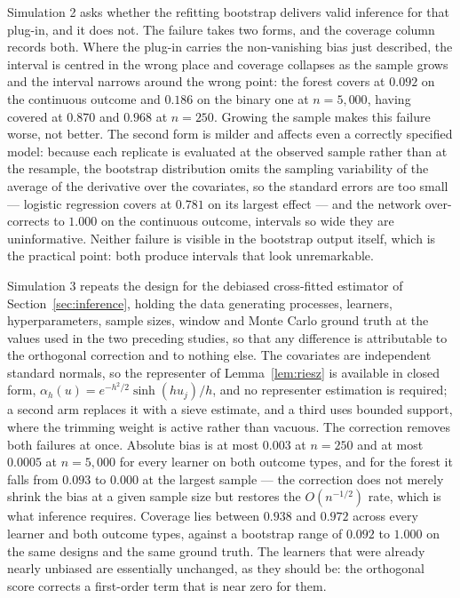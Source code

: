 \documentclass[12pt,a4paper]{article}
\numberwithin{equation}{section}
\theoremstyle{plain}
\theoremstyle{definition}
\begin{document}
	Simulation 2 asks whether the refitting bootstrap delivers valid inference
	for that plug-in, and it does not. The failure takes two forms, and the
	coverage column records both. Where the plug-in carries the non-vanishing
	bias just described, the interval is centred in the wrong place and
	coverage collapses as the sample grows and the interval narrows around the
	wrong point: the forest covers at $0.092$ on the continuous outcome and
	$0.186$ on the binary one at $n=5{,}000$, having covered at $0.870$ and
	$0.968$ at $n=250$. Growing the sample makes this failure worse, not better.
	The second form is milder and affects even a correctly specified model:
	because each replicate is evaluated at the observed sample rather than at the
	resample, the bootstrap distribution omits the sampling variability of the
	average of the derivative over the covariates, so the standard errors are too
	small --- logistic regression covers at $0.781$ on its largest effect --- and
	the network over-corrects to $1.000$ on the continuous outcome, intervals so
	wide they are uninformative. Neither failure is visible in the bootstrap
	output itself, which is the practical point: both produce intervals that look
	unremarkable.

	Simulation 3 repeats the design for the debiased cross-fitted estimator of
	Section~\ref{sec:inference}, holding the data generating processes, learners,
	hyperparameters, sample sizes, window and Monte Carlo ground truth at the
	values used in the two preceding studies, so that any difference is
	attributable to the orthogonal correction and to nothing else. The covariates
	are independent standard normals, so the representer of
	Lemma~\ref{lem:riesz} is available in closed form,
	$\alpha_h(u) = e^{-h^2/2}\sinh(h u_j)/h$, and no representer estimation is
	required; a second arm replaces it with a sieve estimate, and a third uses
	bounded support, where the trimming weight is active rather than vacuous. The correction removes both failures at once.
	Absolute bias is at most $0.003$ at $n=250$ and at most $0.0005$ at
	$n=5{,}000$ for every learner on both outcome types, and for the forest it
	falls from $0.093$ to $0.000$ at the largest sample --- the correction does
	not merely shrink the bias at a given sample size but restores the
	$O(n^{-1/2})$ rate, which is what inference requires. Coverage lies between
	$0.938$ and $0.972$ across every learner and both outcome types, against a
	bootstrap range of $0.092$ to $1.000$ on the same designs and the same
	ground truth. The learners that were already nearly unbiased are essentially
	unchanged, as they should be: the orthogonal score corrects a first-order
	term that is near zero for them.
\end{document}
